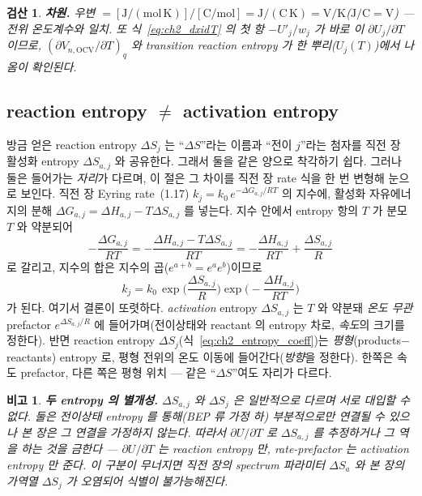 \documentclass[11pt,a4paper]{article}
\newtheorem*{flagbox}{비고}
\newtheorem*{verifybox}{검산}
\newcommand{\OCV}{\mathrm{OCV}}
\begin{document}
\begin{verifybox}
\textbf{차원.} 우변 $=[\mathrm{J/(mol\,K)}]/[\mathrm{C/mol}]=\mathrm{J/(C\,K)}=\mathrm{V/K}$($\mathrm{J/C}=\mathrm V$)
— 전위 온도계수와 일치. 또 식~\eqref{eq:ch2_dxidT} 의 첫 항 $-U'_j/w_j$ 가 바로 이 $\partial U_j/\partial T$ 이므로,
$(\partial V_{n,\OCV}/\partial T)_q$ 와 transition reaction entropy 가 한 뿌리($U_j(T)$)에서 나옴이 확인된다.
\end{verifybox}

\subsection{reaction entropy $\ne$ activation entropy}\label{sec:ch2_two_entropy}
방금 얻은 reaction entropy $\Delta S_j$ 는 ``$\Delta S$''라는 이름과 ``전이 $j$''라는 첨자를 직전 장 활성화 entropy
$\Delta S_{a,j}$ 와 공유한다. 그래서 둘을 같은 양으로 착각하기 쉽다. 그러나 둘은 들어가는 \emph{자리}가 다르며,
이 절은 그 차이를 직전 장 rate 식을 한 번 변형해 눈으로 보인다. 직전 장 Eyring rate~(1.17)
\cite{eyring1935} $k_j=k_0\,e^{-\Delta G_{a,j}/RT}$ 의 지수에, 활성화 자유에너지의 분해
$\Delta G_{a,j}=\Delta H_{a,j}-T\Delta S_{a,j}$ 를 넣는다. 지수 안에서 entropy 항의 $T$ 가 분모 $T$ 와 약분되어
\begin{equation}
-\frac{\Delta G_{a,j}}{RT}=-\frac{\Delta H_{a,j}-T\Delta S_{a,j}}{RT}=-\frac{\Delta H_{a,j}}{RT}+\frac{\Delta S_{a,j}}{R}
\label{eq:ch2_eyring_split}
\end{equation}
로 갈리고, 지수의 합은 지수의 곱($e^{a+b}=e^a e^b$)이므로
\begin{equation}
k_j=k_0\,\exp\!\Big(\frac{\Delta S_{a,j}}{R}\Big)\exp\!\Big(-\frac{\Delta H_{a,j}}{RT}\Big)
\label{eq:ch2_eyring_entropy}
\end{equation}
가 된다. 여기서 결론이 또렷하다. \emph{activation} entropy $\Delta S_{a,j}$ 는 $T$ 와 약분돼 \emph{온도 무관}
prefactor $e^{\Delta S_{a,j}/R}$ 에 들어가며(전이상태와 reactant 의 entropy 차로, \emph{속도}의 크기를 정한다).
반면 reaction entropy $\Delta S_j$(식~\eqref{eq:ch2_entropy_coeff})는 \emph{평형}(products$-$reactants) entropy 로,
평형 전위의 온도 이동에 들어간다(\emph{방향}을 정한다). 한쪽은 속도 prefactor, 다른 쪽은 평형 위치 — 같은
``$\Delta S$''여도 자리가 다르다.
\begin{flagbox}
\textbf{두 entropy 의 별개성.} $\Delta S_{a,j}$ 와 $\Delta S_j$ 은 일반적으로 \emph{다르며} 서로 대입할 수 없다.
둘은 전이상태 entropy 를 통해(BEP 류 가정 하) 부분적으로만 연결될 수 있으나 본 장은 그 연결을 \emph{가정하지
않는다}. 따라서 $\partial U/\partial T$ 로 $\Delta S_{a,j}$ 를 추정하거나 그 역을 하는 것을 금한다 —
$\partial U/\partial T$ 는 reaction entropy 만, rate-prefactor 는 activation entropy 만 준다. 이 구분이 무너지면
직전 장의 spectrum 파라미터 $\Delta S_a$ 와 본 장의 가역열 $\Delta S_j$ 가 오염되어 식별이 불가능해진다.
\end{flagbox}
\end{document}
